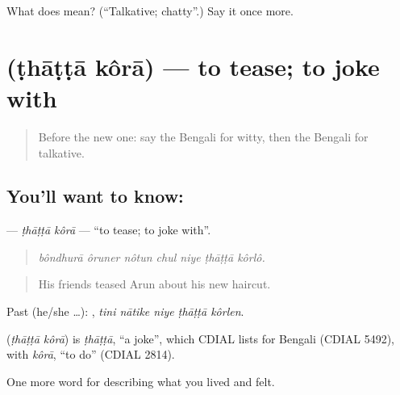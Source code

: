 \begin{tcolorbox}[breakable,colback=teal!4,colframe=teal!35!black,title={Before you move on}]
What does  mean? (\textquotedblleft{}Talkative; chatty\textquotedblright{}.) Say it once more.
\end{tcolorbox}
\section[\texorpdfstring{\bn{ঠাট্টা} \bn{করা} (ṭhāṭṭā kôrā)}{ঠাট্টা করা (ṭhāṭṭā kôrā)}]{  (ṭhāṭṭā kôrā) — to tease; to joke with}

\label{lesson:BN-C463-thatta-kora}



\begin{quote}
Before the new one: say the Bengali for witty, then the Bengali for talkative.
\end{quote}

\subsection*{You'll want to know:  }
\textbf{ } — \emph{ṭhāṭṭā kôrā} — \textquotedblleft{}to tease; to joke with\textquotedblright{}.

\begin{quote}
      
\end{quote}

\begin{quote}
\emph{bôndhurā ôruner nôtun chul niye ṭhāṭṭā kôrlô.}
\end{quote}

\begin{quote}
His friends teased Arun about his new haircut.
\end{quote}

Past (he/she …):     , \emph{tini nātike niye ṭhāṭṭā kôrlen}.

\begin{cousinweb}
\textbf{ } (\emph{ṭhāṭṭā kôrā}) is \emph{ṭhāṭṭā}, \textquotedblleft{}a joke\textquotedblright{}, which CDIAL lists for Bengali (CDIAL 5492), with \emph{kôrā}, \textquotedblleft{}to do\textquotedblright{} (CDIAL 2814).
\end{cousinweb}

\begin{grammarlens}[title={What you've built}]
One more word for describing what you lived and felt.
\end{grammarlens}

